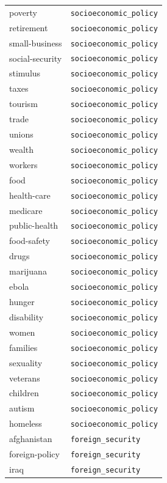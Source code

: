 \begin{longtable}{ll}
poverty & \texttt{socioeconomic\_policy} \\
retirement & \texttt{socioeconomic\_policy} \\
small-business & \texttt{socioeconomic\_policy} \\
social-security & \texttt{socioeconomic\_policy} \\
stimulus & \texttt{socioeconomic\_policy} \\
taxes & \texttt{socioeconomic\_policy} \\
tourism & \texttt{socioeconomic\_policy} \\
trade & \texttt{socioeconomic\_policy} \\
unions & \texttt{socioeconomic\_policy} \\
wealth & \texttt{socioeconomic\_policy} \\
workers & \texttt{socioeconomic\_policy} \\
food & \texttt{socioeconomic\_policy} \\
health-care & \texttt{socioeconomic\_policy} \\
medicare & \texttt{socioeconomic\_policy} \\
public-health & \texttt{socioeconomic\_policy} \\
food-safety & \texttt{socioeconomic\_policy} \\
drugs & \texttt{socioeconomic\_policy} \\
marijuana & \texttt{socioeconomic\_policy} \\
ebola & \texttt{socioeconomic\_policy} \\
hunger & \texttt{socioeconomic\_policy} \\
disability & \texttt{socioeconomic\_policy} \\
women & \texttt{socioeconomic\_policy} \\
families & \texttt{socioeconomic\_policy} \\
sexuality & \texttt{socioeconomic\_policy} \\
veterans & \texttt{socioeconomic\_policy} \\
children & \texttt{socioeconomic\_policy} \\
autism & \texttt{socioeconomic\_policy} \\
homeless & \texttt{socioeconomic\_policy} \\
\midrule
afghanistan & \texttt{foreign\_security} \\
foreign-policy & \texttt{foreign\_security} \\
iraq & \texttt{foreign\_security} \\

\end{longtable}
